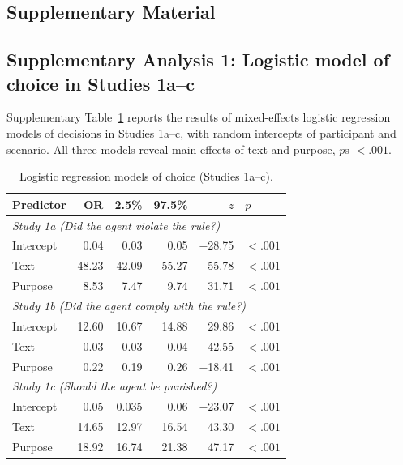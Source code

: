 \documentclass[pdflatex,sn-nature]{sn-jnl}
\begin{document}
\clearpage
\begin{appendices}

\renewcommand{\thetable}{S\arabic{table}}
\renewcommand{\thefigure}{S\arabic{figure}}

\section*{Supplementary Material}

\FloatBarrier

\subsection*{Supplementary Analysis 1: Logistic model of choice in Studies 1a--c}
\label{supp:analysis1}

Supplementary Table~\ref{tab:S1} reports the results of mixed-effects logistic regression models of decisions in Studies 1a--c, with random intercepts of participant and scenario. All three models reveal main effects of text and purpose, $p$s $< .001$.


\begin{table}[htbp]
\caption{Logistic regression models of choice (Studies 1a--c).}
\label{tab:S1}
\begin{tabular*}{\textwidth}{@{\extracolsep{\fill}}lrrrrl}
\toprule
Predictor & OR & 2.5\% & 97.5\% & $z$ & $p$ \\
\midrule
\multicolumn{6}{l}{\textit{Study 1a (Did the agent violate the rule?)}} \\
Intercept & 0.04 & 0.03 & 0.05 & $-$28.75 & $<.001$ \\
Text      & 48.23 & 42.09 & 55.27 & 55.78 & $<.001$ \\
Purpose   & 8.53  & 7.47  & 9.74  & 31.71 & $<.001$ \\
\midrule
\multicolumn{6}{l}{\textit{Study 1b (Did the agent comply with the rule?)}} \\
Intercept & 12.60 & 10.67 & 14.88 & 29.86 & $<.001$ \\
Text      & 0.03  & 0.03  & 0.04  & $-$42.55 & $<.001$ \\
Purpose   & 0.22  & 0.19  & 0.26  & $-$18.41 & $<.001$ \\
\midrule
\multicolumn{6}{l}{\textit{Study 1c (Should the agent be punished?)}} \\
Intercept & 0.05  & 0.035 & 0.06  & $-$23.07 & $<.001$ \\
Text      & 14.65 & 12.97 & 16.54 & 43.30 & $<.001$ \\
Purpose   & 18.92 & 16.74 & 21.38 & 47.17 & $<.001$ \\
\bottomrule
\end{tabular*}
\end{table}


\end{appendices}
\end{document}
